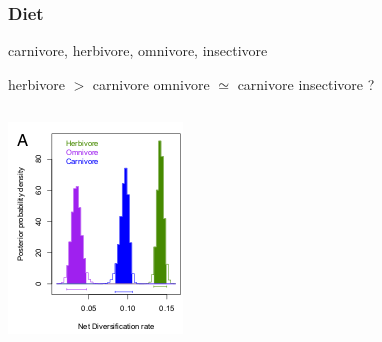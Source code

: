 \documentclass{beamer}
\begin{document}
\begin{frame}
  \frametitle{Diet}
  
  \begin{center}
    carnivore, herbivore, omnivore, insectivore

    \vspace{0.2cm}

    herbivore \(>\) carnivore \hspace{0.3cm} omnivore \(\simeq\) carnivore \hspace{0.5cm} insectivore ?

  \end{center}

  \vspace{0.2cm}

  \begin{columns}
    \begin{column}{0.5\textwidth}
      \includegraphics[height=0.5\textheight,width=\textwidth,keepaspectratio=true]{figure/dietdiv}
      

\end{column}
\end{columns}
\end{frame}
\end{document}
